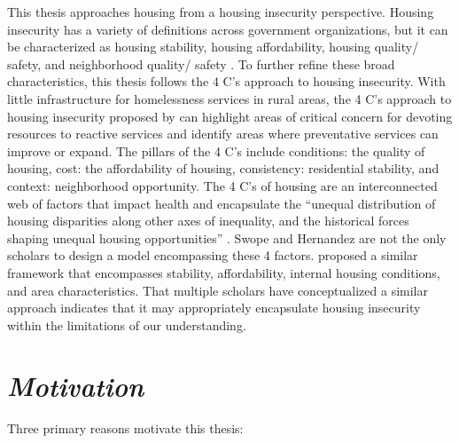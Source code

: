 This thesis approaches housing from a housing insecurity perspective. Housing insecurity has a variety of definitions across government organizations, but it can be characterized as housing stability, housing affordability, housing quality/ safety, and neighborhood quality/ safety \citep{cox_road_2019}. To further refine these broad characteristics, this thesis follows the 4 C's approach to housing insecurity. With little infrastructure for homelessness services in rural areas, the 4 C’s approach to housing insecurity proposed by \citet{hernandez_housing_2019} can highlight areas of critical concern for devoting resources to reactive services and identify areas where preventative services can improve or expand. The pillars of the 4 C's include conditions: the quality of housing, cost: the affordability of housing, consistency: residential stability, and context: neighborhood opportunity. The 4 C’s of housing are an interconnected web of factors that impact health and encapsulate the “unequal distribution of housing disparities along other axes of inequality, and the historical forces shaping unequal housing opportunities” \citep[1]{hernandez_housing_2019}.  Swope and Hernandez are not the only scholars to design a model encompassing these 4 factors. \citet{metzger_fair_2017} proposed a similar framework that encompasses stability, affordability, internal housing conditions, and area characteristics. That multiple scholars have conceptualized a similar approach indicates that it may appropriately encapsulate housing insecurity within the limitations of our understanding. 

\section{\textit{Motivation}}
Three primary reasons motivate this thesis:

